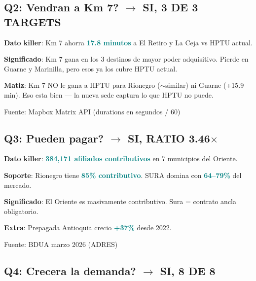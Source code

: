 \documentclass[11pt, a4paper]{article}
\newcommand{\hl}[1]{\textcolor{teal}{\textbf{#1}}}
\begin{document}
\subsection{Q2: Vendran a Km 7? $\to$ SI, 3 DE 3 TARGETS}

\begin{tip}
\textbf{Dato killer}: Km 7 ahorra \hl{17.8 minutos} a El Retiro y La Ceja vs HPTU actual.

\vspace{2pt}
\textbf{Significado}: Km 7 gana en los 3 destinos de mayor poder adquisitivo. Pierde en Guarne y Marinilla, pero esos ya los cubre HPTU actual.

\vspace{2pt}
\textbf{Matiz}: Km 7 NO le gana a HPTU para Rionegro ($\sim$similar) ni Guarne (+15.9 min). Eso esta bien --- la nueva sede captura lo que HPTU no puede.

\vspace{2pt}
{\small\color{slate}Fuente: Mapbox Matrix API (durations en segundos / 60)}
\end{tip}

\subsection{Q3: Pueden pagar? $\to$ SI, RATIO 3.46$\times$}

\begin{tip}
\textbf{Dato killer}: \hl{384,171 afiliados contributivos} en 7 municipios del Oriente.

\vspace{2pt}
\textbf{Soporte}: Rionegro tiene \hl{85\% contributivo}. SURA domina con \hl{64--79\%} del mercado.

\vspace{2pt}
\textbf{Significado}: El Oriente es masivamente contributivo. Sura = contrato ancla obligatorio.

\vspace{2pt}
\textbf{Extra}: Prepagada Antioquia crecio \hl{+37\%} desde 2022.

\vspace{2pt}
{\small\color{slate}Fuente: BDUA marzo 2026 (ADRES)}
\end{tip}

\subsection{Q4: Crecera la demanda? $\to$ SI, 8 DE 8}
\end{document}
